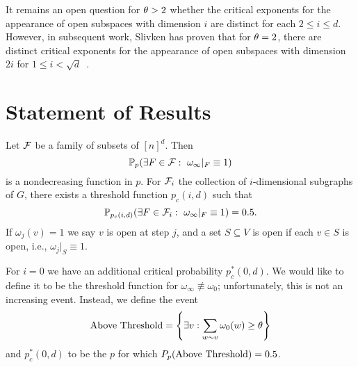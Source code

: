 It remains an open question for $\theta>2$ whether the critical exponents for the appearance of open subspaces with dimension $i$ are distinct for each $2\leq i \leq d$. However, in subsequent work, Slivken has proven that for $\theta =2$, there are distinct critical exponents for the appearance of open subspaces with dimension $2i$ for $1\le i < \sqrt{d}$~\cite{slivken}.




\section{Statement of Results}
Let $\mathcal F$ be a family of subsets of $[n]^d$. Then
$$\mathbb{P}_p(\exists F \in \mathcal F:\  \omega_\infty|_F\equiv 1)$$
is a nondecreasing function in $p$. For $\mathcal F_i$ the collection of $i$-dimensional subgraphs of $G$, there exists a threshold function $p_c(i,d)$ such that 
$$\mathbb{P}_{p_c(i,d)}(\exists F \in \mathcal F_i:\  \omega_\infty|_F\equiv1)=0.5.$$
If $\omega_j(v)=1$ we say $v$ is open at step $j$, and a set $S \subseteq V$ is open if each $v \in S$ is open, 
i.e., $\omega_j|_S\equiv 1$.

For $i=0$ we have an additional critical probability
$p^*_c(0,d)$. We would like to define it to be the threshold function for  
$\omega_\infty \not\equiv \omega_0$; unfortunately, this is not an increasing
event. Instead, we define the event
$$\text{Above Threshold}=\left\{ \exists v: \sum_{w \sim v}\omega_0(w)\geq \theta \right\}$$
and $p^*_c(0,d)$ to be the $p$ for which $P_p(\text{Above Threshold})=0.5$.


\begin{comment}
We believe that for all $i \geq 1$ and $d$, $p_c$ has the following form. 
\begin{conjecture}
For all $i$ and $d$ and $n$ sufficiently large
$$p_c(i,d)=n^{-1 - \frac{c_1(i,d)}{\threshold} - \frac{c_{3/2}(i,d)}{\threshold^{3/2}}+o(\threshold^{-3/2})}.$$
\end{conjecture}
We make substantial progress to proving that this is the
case for all $i$ and $d$, but in general we are only able to prove that if $n$ is sufficinetly large with $\threshold$ then
$$p_c(i,d)=n^{-1 - \frac{c_1(i,d)}{\threshold} - \theta(\threshold^{-3/2})}.$$
In general for fixed $n,d$ and $i$ we get bounds on the critical $p$, but the precise bounds that we get are quite messy to state. In the rest of this section we put all of our results in a common form. Many of the theorems have are given in a stronger form in the following sections. 
\end{comment}

